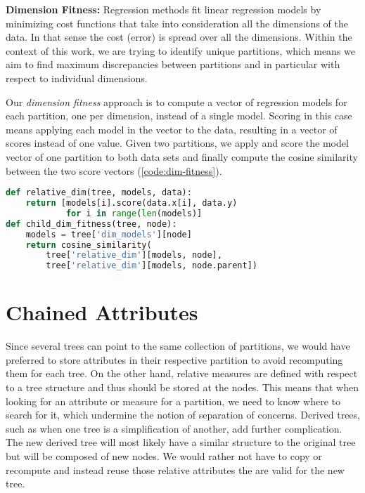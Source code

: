 \textbf{Dimension Fitness:}
Regression methods fit linear regression models by minimizing cost functions that take into consideration all the dimensions of the data. In that sense the cost (error) is spread over all the dimensions. Within the context of this work, we are trying to identify unique partitions, which means we aim to find maximum discrepancies between partitions and in particular with respect to individual dimensions.

Our \textit{dimension fitness} approach is to compute a vector of regression models for each partition, one per dimension, instead of a single model. Scoring in this case means applying each model in the vector to the data, resulting in a vector of scores instead of one value. Given two partitions, we apply and score the model vector of one partition to both data sets and finally compute the cosine similarity between the two score vectors (\autoref{code:dim-fitness}).

\begin{lstlisting}[language=Python, caption=Dimension Fitness, float=hbt, label=code:dim-fitness]
def relative_dim(tree, models, data):
    return [models[i].score(data.x[i], data.y) 
            for i in range(len(models)]
def child_dim_fitness(tree, node):
    models = tree['dim_models'][node]
    return cosine_similarity(
        tree['relative_dim'][models, node],
        tree['relative_dim'][models, node.parent])
\end{lstlisting}

\vspace{-.1in}
\section{Chained Attributes}
\label{sec:chained_attrs}

Since several trees can point to the same collection of partitions, we would have preferred to store attributes in their respective partition to avoid recomputing them for each tree. On the other hand, relative measures are defined with respect to a tree structure and thus should be stored at the nodes. This means that when looking for an attribute or measure for a partition, we need to know where to search for it, which undermine the notion of separation of concerns.
Derived trees, such as when one tree is a simplification of another, add further complication. The new derived tree will most likely have a similar structure to the original tree but will be composed of new nodes. We would rather not have to copy or recompute and instead reuse those relative attributes the are valid for the new tree. 

